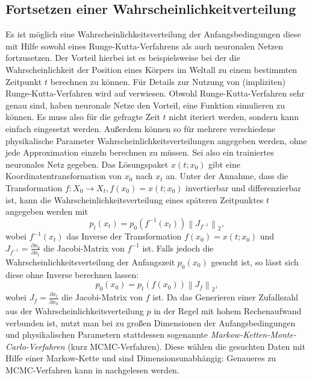 \subsection{Fortsetzen einer Wahrscheinlichkeitverteilung}
\label{subsec:fortsetzeneinerwahrscheinlichkeitsverteilung}
Es ist möglich eine Wahrscheinlichkeitsverteilung der Anfangsbedingungen diese mit Hilfe sowohl eines
Runge-Kutta-Verfahrens als auch neuronalen Netzen fortzusetzen. Der Vorteil hierbei ist es beispielsweise bei der
die Wahrscheinlichkeit der Position eines Körpers im Weltall zu einem bestimmten Zeitpunkt $t$ berechnen zu können. Für
Details zur Nutzung von (impliziten) Runge-Kutta-Verfahren wird auf \cite{aristoffIMPLICITRUNGEKUTTAMETHODS} verwiesen.
Obwohl Runge-Kutta-Verfahren sehr genau sind, haben neuronale Netze den Vorteil, eine Funktion simulieren zu können.
Es muss also für die gefragte Zeit $t$ nicht iteriert werden, sondern kann einfach eingesetzt werden. Außerdem können
so für mehrere verschiedene physikalische Parameter Wahrscheinlichkeitsverteilungen angegeben werden, ohne jede
Approximation einzeln berechnen zu müssen. Sei also ein trainiertes neuronales Netz gegeben. Das Lösungspaket
$x(t; x_0)$ gibt eine Koordinatentransformation von $x_0$ nach $x_t$ an. Unter der Annahme, dass die Transformation
$f: X_0 \rightarrow X_t, f(x_0) = x(t;x_0)$ invertierbar und differenzierbar ist, kann die Wahrscheinlichkeitsverteilung
eines späteren Zeitpunktes $t$ angegeben werden mit
\[
    p_t(x_t) = p_0(f^{-1}(x_t)) \left\lVert J_{f^{-1}} \right\rVert_2,
\]
wobei $f^{-1}(x_t)$ das Inverse der Transformation $f(x_0)=x(t;x_0)$ und $J_{f^{-1}}= \frac{\partial x_0}{\partial x_t}$
die Jacobi-Matrix von $f^{-1}$ ist. Falls jedoch die Wahrscheinlichkeitsverteilung der Anfangszeit $p_0(x_0)$ gesucht
ist, so lässt sich diese ohne Inverse berechnen lassen:
\[
    p_0(x_0) = p_t(f(x_0))\left\lVert J_f \right\rVert_2,
\]
wobei $J_f= \frac{\partial x_t}{\partial x_0}$ die Jacobi-Matrix von $f$ ist. Da das Generieren einer Zufallszahl aus
der Wahrscheinlichkeitsverteilung $p$ in der Regel mit hohem Rechenaufwand verbunden ist, nutzt man bei zu großen
Dimensionen der Anfangsbedingungen und physikalischen Parametern stattdessen sogenannte
\textit{Markow-Ketten-Monte-Carlo-Verfahren} (kurz MCMC-Verfahren). Diese wählen die gesuchten Daten mit Hilfe einer
Markow-Kette und sind Dimensionsunabhängig: Genaueres zu MCMC-Verfahren kann in \cite{SamplingMethods} nachgelesen
werden.

